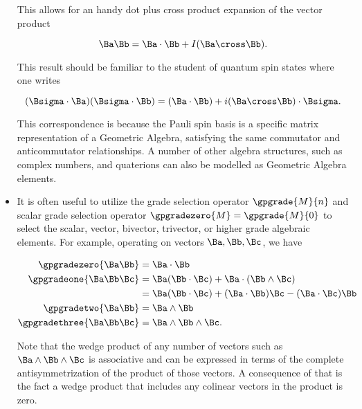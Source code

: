 \begin{itemize}
This allows for an handy dot plus cross product expansion of the vector product

\begin{dmath}\label{eqn:gaTutorial:180}
\Ba \Bb = \Ba \cdot \Bb + I (\Ba \cross \Bb).
\end{dmath}

This result should be familiar to the student of quantum spin states where one writes

\begin{dmath}\label{eqn:gaTutorial:200}
(\Bsigma \cdot \Ba) (\Bsigma \cdot \Bb) = (\Ba \cdot \Bb) + i (\Ba \cross \Bb) \cdot \Bsigma.
\end{dmath}

This correspondence is because the Pauli spin basis is a specific matrix representation of a Geometric Algebra, satisfying the same commutator and anticommutator relationships.  A number of other algebra structures, such as complex numbers, and quaterions can also be modelled as Geometric Algebra elements.
\item It is often useful to utilize the grade selection operator
\( \gpgrade{M}{n} \) and scalar grade selection operator \( \gpgradezero{M} = \gpgrade{M}{0} \)
to select the scalar, vector, bivector, trivector, or higher grade algebraic elements.  For example, operating on vectors \( \Ba, \Bb, \Bc \), we have

\begin{dmath}\label{eqn:gaTutorial:580}
\begin{aligned}
\gpgradezero{ \Ba \Bb }
&= \Ba \cdot \Bb \\
\gpgradeone{ \Ba \Bb \Bc }
&= 
\Ba (\Bb \cdot \Bc)
+ 
\Ba \cdot (\Bb \wedge \Bc) \\
&=
\Ba (\Bb \cdot \Bc)
+ 
(\Ba \cdot \Bb) \Bc
- 
(\Ba \cdot \Bc) \Bb \\
\gpgradetwo{\Ba \Bb} &=
\Ba \wedge \Bb \\
\gpgradethree{\Ba \Bb \Bc} &=
\Ba \wedge \Bb \wedge \Bc.
\end{aligned}
\end{dmath}

Note that the wedge product of any number of vectors such as \( \Ba \wedge \Bb \wedge \Bc \) is associative and can be expressed in terms of the complete antisymmetrization of the product of those vectors.  A consequence of that is the fact a wedge product that includes any colinear vectors in the product is zero.
\end{itemize}

